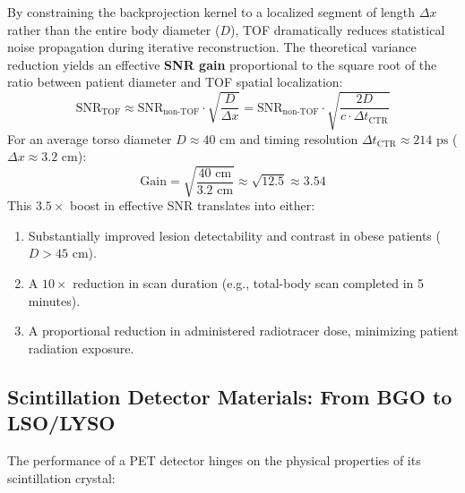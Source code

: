 \documentclass[11pt,a4paper]{article}
\begin{document}
\begin{physicsbox}
By constraining the backprojection kernel to a localized segment of length $\Delta x$ rather than the entire body diameter ($D$), TOF dramatically reduces statistical noise propagation during iterative reconstruction. The theoretical variance reduction yields an effective \textbf{SNR gain} proportional to the square root of the ratio between patient diameter and TOF spatial localization:
\begin{equation}
    \text{SNR}_{\text{TOF}} \approx \text{SNR}_{\text{non-TOF}} \cdot \sqrt{\frac{D}{\Delta x}} = \text{SNR}_{\text{non-TOF}} \cdot \sqrt{\frac{2 D}{c \cdot \Delta t_{\text{CTR}}}}
\end{equation}
For an average torso diameter $D \approx 40\text{ cm}$ and timing resolution $\Delta t_{\text{CTR}} \approx 214\text{ ps}$ ($\Delta x \approx 3.2\text{ cm}$):
\begin{equation}
    \text{Gain} = \sqrt{\frac{40\text{ cm}}{3.2\text{ cm}}} \approx \sqrt{12.5} \approx \mathbf{3.54}
\end{equation}
This $3.5\times$ boost in effective SNR translates into either:
\begin{enumerate}
    \item Substantially improved lesion detectability and contrast in obese patients ($D > 45\text{ cm}$).
    \item A $10\times$ reduction in scan duration (e.g., total-body scan completed in 5 minutes).
    \item A proportional reduction in administered radiotracer dose, minimizing patient radiation exposure.
\end{enumerate}
\end{physicsbox}

\subsection{Scintillation Detector Materials: From BGO to LSO/LYSO}
The performance of a PET detector hinges on the physical properties of its scintillation crystal:
\end{document}
